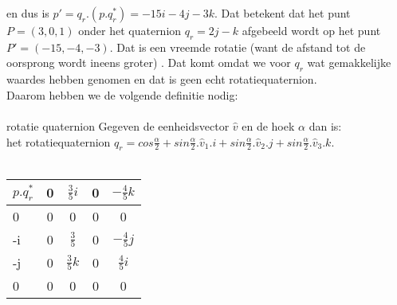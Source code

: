 \documentclass[hidelinks, a4wide, 12pt,  twoside]{book}
\begin{document}
en dus is $ p' = q_r.(p.q^*_r) =  -15i -4j -3k. $ Dat betekent dat het punt $ P = (3,0,1) $  onder het quaternion  $ q_r = 2j-k $ afgebeeld wordt op het punt $ P' = (-15, -4, -3). $ Dat is een vreemde rotatie (want de afstand tot de oorsprong wordt ineens groter) . Dat komt omdat we voor $ q_r $ wat gemakkelijke waardes hebben genomen en dat is geen echt rotatiequaternion.\\
Daarom hebben we de volgende definitie nodig:\\ \\
\mydef
{rotatie quaternion}
{Gegeven de eenheidsvector $\hat{v} $  en de  hoek $\alpha $ dan is:\\
	het rotatiequaternion \quad	
	$ q_r = cos\frac{\alpha}{2} + sin\frac{\alpha}{2} .\hat{v}_1.i
	+ sin\frac{\alpha}{2} .\hat{v}_2.j + sin\frac{\alpha}{2} .\hat{v}_3.k $.	    
}\\
\\
\begin{center}
	\begin{tabular}{ | l || c | c |c |c |}
		\hline
		$ p.q^*_r $  & 0 & $  \frac{3}{5}i  $  & 0 & $ - \frac{4}{5}k $  \\ \hline \hline
		0                 & 0 & 0                          & 0    & 0  \\ \hline
		-i                & 0 &  $  \frac{3}{5}  $  & 0   & $ - \frac{4}{5}j $\\ \hline
		-j                & 0 &  $  \frac{3}{5}k $  & 0     & $  \frac{4}{5}i $\\ \hline
		0                 & 0 & 0                          & 0   & 0 \\
		\hline 
	\end{tabular}
\end{center}
\end{document}
